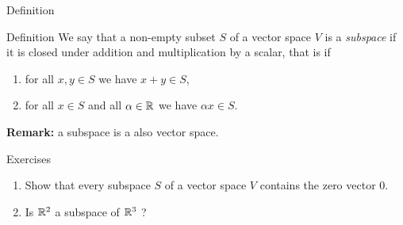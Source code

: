 \documentclass{beamer}
\begin{document}
\begin{frame}[t]{Definition}
	\begin{block}{Definition}
	We say that a non-empty subset $S$ of a vector space $V$ is a \emph{subspace} if it is closed under addition and multiplication by a scalar, that is if
	\begin{enumerate}
		\item for all $x,y \in S$ we have $x + y \in S$,
		\item for all $x \in S$ and all $\alpha \in \mathbb{R}$ we have $\alpha x \in S$.
	\end{enumerate}
	\end{block}
	\vspace{4cm}
	\textbf{Remark:} a subspace is a also vector space.
\end{frame}

\begin{frame}[t]{Exercises}
	\vspace{-0.5cm}
	\begin{exampleblock}{}
		\begin{enumerate}
			\item Show that every subspace $S$ of a vector space $V$ contains the zero vector $0$.
			\item Is $\mathbb{R}^2$ a subspace of $\mathbb{R}^3$ ?
		\end{enumerate}
	\end{exampleblock}
\end{frame}


\end{document}
